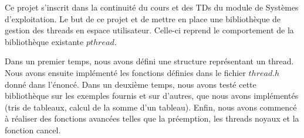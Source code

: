 Ce projet s'inscrit dans la continuité du cours et des TDs du module de
Systèmes d'exploitation. Le but de ce projet et de mettre en place une
bibliothèque de gestion des threads en espace utilisateur. Celle-ci reprend le
comportement de la bibliothèque existante $pthread$.

Dans un premier temps, nous avons défini une structure représentant un
thread. Nous avons ensuite implémenté les fonctions définies dans le fichier
$thread.h$ donné dans l'énoncé. Dans un deuxième temps, nous avons testé cette
bibliothèque sur les exemples fournis et sur d'autres, que nous avons
implémentés (tris de tableaux, calcul de la somme d'un tableau). Enfin, nous
avons commencé à réaliser des fonctions avancées telles que la préemption, les
threads noyaux et la fonction cancel.

